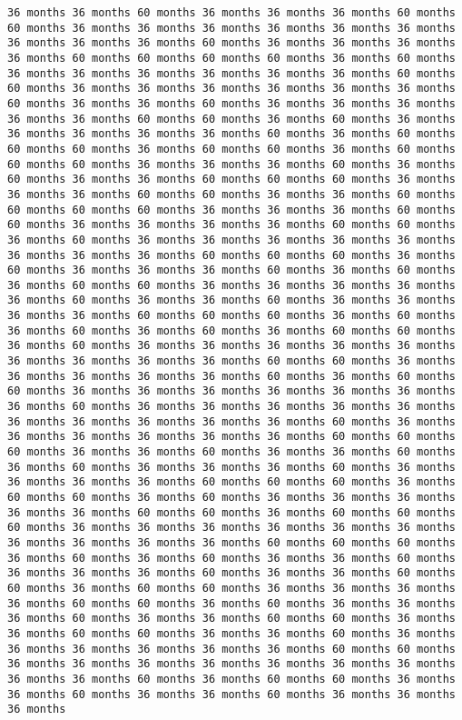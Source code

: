 \documentclass[11pt]{article}
\begin{document}
\begin{Verbatim}[commandchars=\\\{\}, frame=single, framerule=2mm, rulecolor=\color{outerrorbackground}]
36 months 36 months 60 months 36 months 36 months 36 months 60 months 60 months 36 months 36 months 36 months 36 months 36 months 36 months 36 months 36 months 36 months 60 months 36 months 36 months 36 months 36 months 60 months 60 months 60 months 60 months 36 months 60 months 36 months 36 months 36 months 36 months 36 months 36 months 60 months 60 months 36 months 36 months 36 months 36 months 36 months 36 months 60 months 36 months 36 months 60 months 36 months 36 months 36 months 36 months 36 months 60 months 60 months 36 months 60 months 36 months 36 months 36 months 36 months 36 months 60 months 36 months 60 months 60 months 60 months 36 months 60 months 60 months 36 months 60 months 60 months 60 months 36 months 36 months 36 months 60 months 36 months 60 months 36 months 36 months 60 months 60 months 60 months 36 months 36 months 36 months 60 months 60 months 36 months 36 months 60 months 60 months 60 months 60 months 36 months 36 months 36 months 60 months 60 months 36 months 36 months 36 months 36 months 60 months 60 months 36 months 60 months 36 months 36 months 36 months 36 months 36 months 36 months 36 months 36 months 60 months 60 months 60 months 36 months 60 months 36 months 36 months 36 months 60 months 36 months 60 months 36 months 60 months 60 months 36 months 36 months 36 months 36 months 36 months 60 months 36 months 36 months 60 months 36 months 36 months 36 months 36 months 60 months 60 months 60 months 36 months 60 months 36 months 60 months 36 months 60 months 36 months 60 months 60 months 36 months 60 months 36 months 36 months 36 months 36 months 36 months 36 months 36 months 36 months 36 months 60 months 60 months 36 months 36 months 36 months 36 months 36 months 60 months 36 months 60 months 60 months 36 months 36 months 36 months 36 months 36 months 36 months 36 months 60 months 36 months 36 months 36 months 36 months 36 months 36 months 36 months 36 months 36 months 36 months 60 months 36 months 36 months 36 months 36 months 36 months 36 months 60 months 60 months 60 months 36 months 36 months 60 months 36 months 36 months 60 months 36 months 60 months 36 months 36 months 36 months 60 months 36 months 36 months 36 months 36 months 60 months 60 months 60 months 36 months 60 months 60 months 36 months 60 months 36 months 36 months 36 months 36 months 36 months 60 months 60 months 36 months 60 months 60 months 60 months 36 months 36 months 36 months 36 months 36 months 36 months 36 months 36 months 36 months 36 months 60 months 60 months 60 months 36 months 60 months 36 months 60 months 36 months 36 months 60 months 36 months 36 months 36 months 60 months 36 months 36 months 60 months 60 months 36 months 60 months 60 months 36 months 36 months 36 months 36 months 60 months 60 months 36 months 60 months 36 months 36 months 36 months 60 months 36 months 36 months 60 months 60 months 36 months 36 months 60 months 60 months 36 months 36 months 60 months 36 months 36 months 36 months 36 months 36 months 36 months 60 months 60 months 36 months 36 months 36 months 36 months 36 months 36 months 36 months 36 months 36 months 60 months 36 months 60 months 60 months 36 months 36 months 60 months 36 months 36 months 60 months 36 months 36 months 36 months 
\end{Verbatim}
\end{document}
